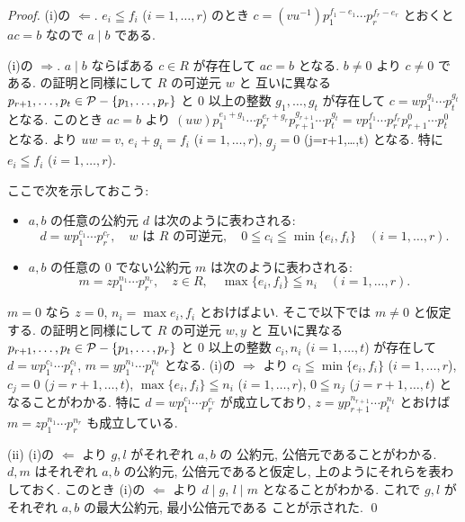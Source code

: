 \documentclass[12pt,twoside]{jarticle}
\begin{document}
\begin{proof}
 (i)の $\Longleftarrow$.
 $e_i\leqq f_i$ ($i=1,\ldots,r$) のとき %
 $c=(vu^{-1})p_1^{f_1-e_1}\cdots p_r^{f_r-e_r}$ とおくと $ac=b$
 なので $a\mid b$ である.

 (i)の $\Longrightarrow$.
 $a\mid b$ ならばある $c\in R$ が存在して $ac=b$ となる.
 $b\ne 0$ より $c\ne 0$ である.
 の証明と同様にして $R$ の可逆元 $w$ と
 互いに異なる $p_{r+1},\ldots,p_t\in{\mathcal P}-\{p_1,\ldots,p_r\}$ 
 と $0$ 以上の整数 $g_1,\ldots,g_t$ が存在して %
 $c=wp_1^{g_1}\cdots p_t^{g_t}$ となる. このとき $ac=b$ より \(
  (uw)p_1^{e_1+g_1}\cdots p_r^{e_r+g_r} p_{r+1}^{g_{r+1}}\cdots p_t^{g_t}
  =
  vp_1^{f_1}\cdots p_r^{f_r} p_{r+1}^0\cdots p_t^0
 \) となる. より $uw=v$, 
 $e_i+g_i=f_i$ ($i=1,\ldots,r$), $g_j=0$ (j=r+1,\ldots,t) となる. 
 特に $e_i\leqq f_i$ ($i=1,\ldots,r$).

 ここで次を示しておこう:
 \begin{itemize}
  \item $a,b$ の任意の公約元 $d$ は次のように表わされる:
  \begin{equation*}
   d = w p_1^{c_1}\cdots p_r^{c_r}, \quad
   \text{$w$ は $R$ の可逆元}, \quad
   0\leqq c_i \leqq \min\{e_i,f_i\} \quad (i=1,\ldots,r).
  \end{equation*}
  \item $a,b$ の任意の $0$ でない公約元 $m$ は次のように表わされる:
  \begin{equation*}
   m = z p_1^{n_1}\cdots p_r^{n_r}, \quad
   z\in R, \quad
   \max\{e_i,f_i\}\leqq n_i \quad (i=1,\ldots,r).
  \end{equation*}
 \end{itemize}
 $m=0$ なら $z=0$, $n_i=\max{e_i,f_i}$ とおけばよい.
 そこで以下では $m\ne 0$ と仮定する.
 の証明と同様にして $R$ の可逆元 $w,y$ と
 互いに異なる $p_{r+1},\ldots,p_t\in{\mathcal P}-\{p_1,\ldots,p_r\}$ 
 と $0$ 以上の整数 $c_i,n_i$ ($i=1,\ldots,t$) が存在して %
 $d = w p_1^{c_1}\cdots p_t^{c_t}$,
 $m = y p_1^{n_1}\cdots p_t^{n_t}$ となる. 
 (i)の $\Longrightarrow$ より %
 $c_i\leqq\min\{e_i,f_i\}$ ($i=1,\ldots,r$), 
 $c_j=0$ ($j=r+1,\ldots,t$),
 $\max\{e_i,f_i\}\leqq n_i$ ($i=1,\ldots,r$), 
 $0\leqq n_j$ ($j=r+1,\ldots,t$) となることがわかる.
 特に $d = w p_1^{c_1}\cdots p_r^{c_r}$ が成立しており, 
 $z=yp_{r+1}^{n_{r+1}}\cdots p_t^{n_t}$ とおけば %
 $m = z p_1^{n_1}\cdots p_r^{n_r}$ も成立している.

 (ii) (i)の $\Longleftarrow$ より $g,l$ がそれぞれ $a,b$ の
 公約元, 公倍元であることがわかる. 
 $d,m$ はそれぞれ $a,b$ の公約元, 公倍元であると仮定し, 
 上のようにそれらを表わしておく.
 このとき (i)の $\Longleftarrow$ より $d\mid g$, $l\mid m$ 
 となることがわかる.
 これで $g,l$ がそれぞれ $a,b$ の最大公約元, 最小公倍元である
 ことが示された.
 \qed
\end{proof}
\end{document}
